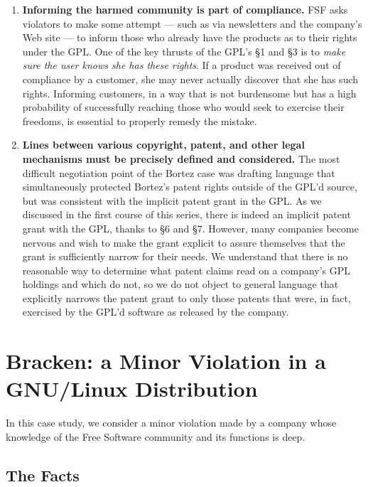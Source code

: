 \begin{enumerate}
\item {\bf Informing the harmed community is part of compliance.} FSF asks
  violators to make some attempt --- such as via newsletters and the
  company's Web site --- to inform those who already have the products as
  to their rights under the GPL\@. One of the key thrusts of the GPL's \S 1 and
  \S 3 is to {\em make sure the user knows she has these rights\/}. If a
  product was received out of compliance by a customer, she may never
  actually discover that she has such rights. Informing customers, in a
  way that is not burdensome but has a high probability of successfully
  reaching those who would seek to exercise their freedoms, is essential
  to properly remedy the mistake.

\item {\bf Lines between various copyright, patent, and other legal
  mechanisms must be precisely defined and considered.}  The most
  difficult negotiation point of the Bortez case was drafting language
  that simultaneously protected Bortez's patent rights outside of the
  GPL'd source, but was consistent with the implicit patent grant in
  the GPL\@. As we discussed in the first course of this series, there is
  indeed an implicit patent grant with the GPL, thanks to \S 6 and \S 7.
  However, many companies become nervous and wish to make the grant
  explicit to assure themselves that the grant is sufficiently narrow for
  their needs. We understand that there is no reasonable way to determine
  what patent claims read on a company's GPL holdings and which do not, so
  we do not object to general language that explicitly narrows the patent
  grant to only those patents that were, in fact, exercised by the GPL'd
  software as released by the company.

\end{enumerate}

\chapter{Bracken: a Minor Violation in a GNU/Linux Distribution}

In this case study, we consider a minor violation made by a company whose
knowledge of the Free Software community and its functions is deep.

\section{The Facts} 


